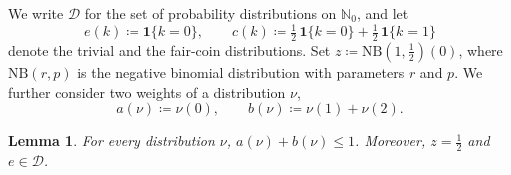 \documentclass{article}
\newtheorem{lemma}{Lemma}
\begin{document}
We write $\mathcal D$ for the set of probability distributions on $\mathbb N_0$, and let
\[
e(k)\coloneqq\mathbf 1\{k=0\},\qquad c(k)\coloneqq\tfrac12\,\mathbf 1\{k=0\}+\tfrac12\,\mathbf 1\{k=1\}
\]
denote the trivial and the fair-coin distributions.
Set $z\coloneqq\mathrm{NB}(1,\frac12)(0)$, where $\mathrm{NB}(r,p)$ is the negative binomial distribution with parameters $r$ and $p$.
We further consider two weights of a distribution $\nu$,
\[
a(\nu)\coloneqq\nu(0),\qquad b(\nu)\coloneqq\nu(1)+\nu(2).
\]

\begin{lemma}\label{weights}
For every distribution $\nu$, $a(\nu)+b(\nu)\le1$.
Moreover, $z=\frac12$ and $e\in\mathcal D$.
\end{lemma}
\end{document}
